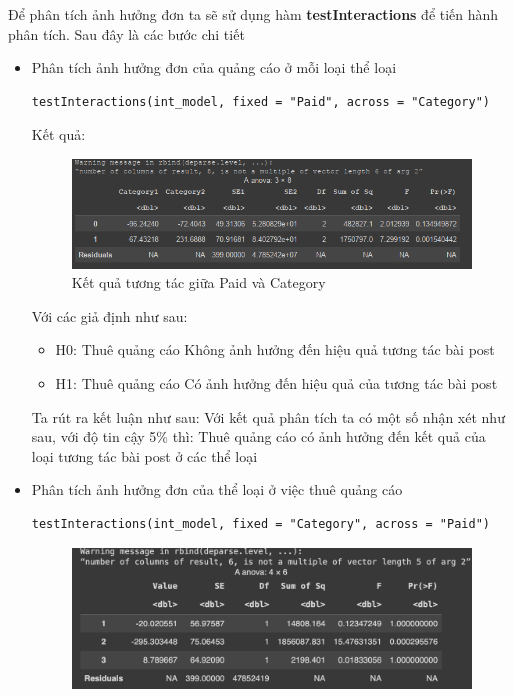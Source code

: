 \begin{itemize}
\begin{itemize}
        Để phân tích ảnh hưởng đơn ta sẽ sử dụng hàm \textbf{testInteractions} để tiến hành phân tích. Sau đây là các bước chi tiết
    \begin{itemize}
        \item Phân tích ảnh hưởng đơn của quảng cáo ở mỗi loại thể loại
            \begin{lstlisting}
testInteractions(int_model, fixed = "Paid", across = "Category")
            \end{lstlisting}
            Kết quả:
            \begin{figure}[H]
                \centering
                \includegraphics[width=0.8\linewidth]{part23_figures/09.png}
                \caption{Kết quả tương tác giữa Paid và Category}
                \label{fig:Kết quả tương tác giữa Paid và Category}
            \end{figure}
            Với các giả định như sau:
            \begin{itemize}
                \item H0:  Thuê quảng cáo Không ảnh hưởng đến hiệu quả tương tác bài post
                \item H1:  Thuê quảng cáo Có ảnh hưởng đến hiệu quả của tương tác bài post
            \end{itemize}
            Ta rút ra kết luận như sau: Với kết quả phân tích ta có một số nhận xét như sau, với độ tin cậy 5\% thì: Thuê quảng cáo có ảnh hưởng đến kết quả của loại tương tác bài post ở các thể loại
        \item Phân tích ảnh hưởng đơn của thể loại ở việc thuê quảng cáo
            \begin{lstlisting}
testInteractions(int_model, fixed = "Category", across = "Paid")
            \end{lstlisting}
            \begin{figure}[H]
                \centering
                \includegraphics[width=0.8\linewidth]{part23_figures/10.png}

\end{figure}
\end{itemize}
\end{itemize}
\end{itemize}
